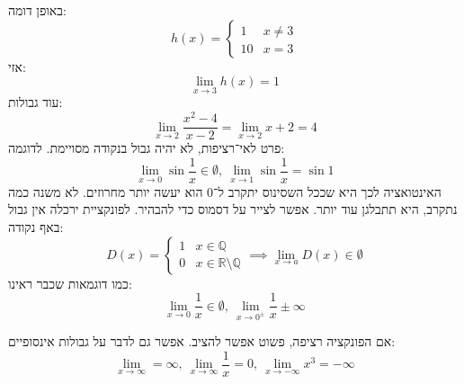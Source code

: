 \documentclass[]{article}
\newcommand\R     {\mathbb{R}}
\newcommand\Q     {\mathbb{Q}}
\newcommand\limi  {\lim_{x \to \infty}}
\newcommand\limni {\lim_{x \to - \infty}}
\begin{document}
	באופן דומה: 
	\[ h(x) = \begin{cases}
		1 & x \neq 3 \\
		10 & x = 3
	\end{cases} \]
	אזי: 
	\[ \lim_{x \to 3} h(x) = 1 \]
	עוד גבולות: 
	\[ \lim_{x \to 2}\frac{x^2 - 4}{x - 2} = \lim_{x \to 2} x + 2 = 4 \]
	פרט לאי־רציפות, לא יהיה גבול בנקודה מסויימת. לדוגמה: 
	\[ \lim_{x \to 0} \sin \frac{1}{x} \in \emptyset, \ \lim_{x \to 1} \sin \frac{1}{x} = \sin 1 \]
	האינטואציה לכך היא שככל השסינוס יתקרב ל־0 הוא יעשה יותר מחרוזים. לא משנה כמה נתקרב, היא תתבלגן עוד יותר. אפשר לצייר על דסמוס כדי להבהיר. 
	לפונקציית ירכלה אין גבול באף נקודה: 
	\[ D(x) = \begin{cases}
		1 & x \in \Q  \\
	0 & x \in \R \setminus \Q
	\end{cases} \implies \lim_{x \to a} D(x) \in \emptyset \]
	כמו דוגמאות שכבר ראינו: 
	\[ \lim_{x \to 0}\frac{1}{x} \in \emptyset, \ \lim_{x \to 0^\pm}\frac{1}{x} \pm \infty \]
	
	אם הפונקציה רציפה, פשוט אפשר להציב. אפשר גם לדבר על גבולות אינסופיים: 
	\[ \lim_{x \to \infty} = \infty, \ \limi \frac{1}{x} = 0, \ \limni x^3 = - \infty \]
	
	
\end{document}
